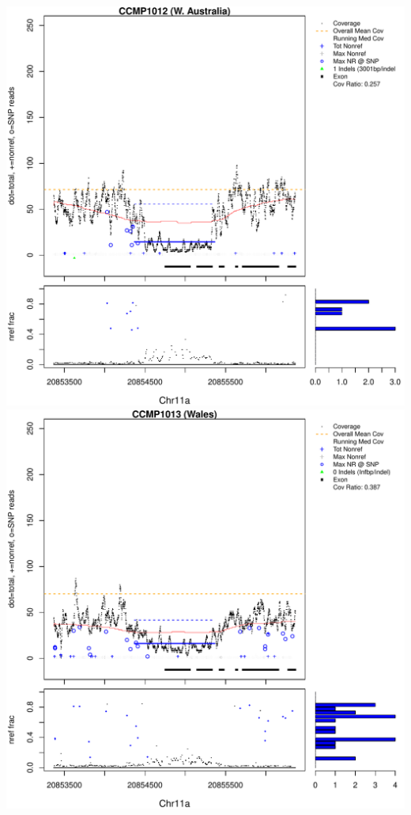 \documentclass{article}\usepackage[]{graphicx}\usepackage[]{color}
\makeatletter
\def\maxwidth{ %
  \ifdim\Gin@nat@width>\linewidth
    \linewidth
  \else
    \Gin@nat@width
  \fi
}
\newenvironment{knitrout}{}{} %
\makeatother
\begin{document}
\begin{knitrout}
{\includegraphics[width=\maxwidth]{figs-knitr/unnamed-chunk-51-3} 
\includegraphics[width=\maxwidth]{figs-knitr/unnamed-chunk-51-4} 
}
\end{knitrout}
\end{document}
